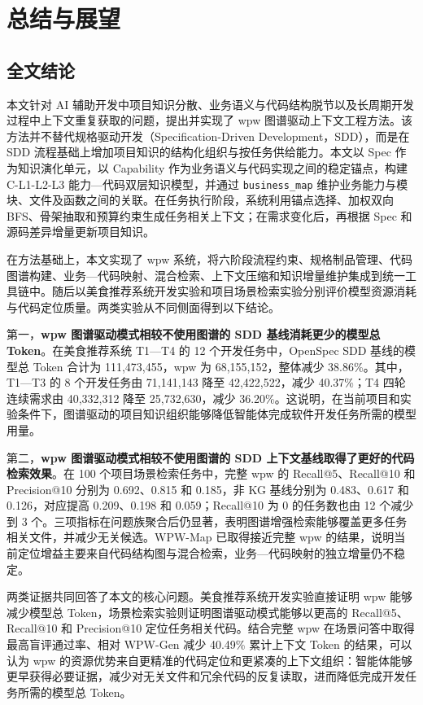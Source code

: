 \chapter{总结与展望}


\section{全文结论}
本文针对 AI 辅助开发中项目知识分散、业务语义与代码结构脱节以及长周期开发过程中上下文重复获取的问题，提出并实现了 wpw 图谱驱动上下文工程方法。该方法并不替代规格驱动开发（Specification-Driven Development，SDD），而是在 SDD 流程基础上增加项目知识的结构化组织与按任务供给能力。本文以 Spec 作为知识演化单元，以 Capability 作为业务语义与代码实现之间的稳定锚点，构建 C-L1-L2-L3 能力—代码双层知识模型，并通过 \texttt{business\_map} 维护业务能力与模块、文件及函数之间的关联。在任务执行阶段，系统利用锚点选择、加权双向 BFS、骨架抽取和预算约束生成任务相关上下文；在需求变化后，再根据 Spec 和源码差异增量更新项目知识。

在方法基础上，本文实现了 wpw 系统，将六阶段流程约束、规格制品管理、代码图谱构建、业务—代码映射、混合检索、上下文压缩和知识增量维护集成到统一工具链中。随后以美食推荐系统开发实验和项目场景检索实验分别评价模型资源消耗与代码定位质量。两类实验从不同侧面得到以下结论。

第一，\textbf{wpw 图谱驱动模式相较不使用图谱的 SDD 基线消耗更少的模型总 Token}。在美食推荐系统 T1—T4 的 12 个开发任务中，OpenSpec SDD 基线的模型总 Token 合计为 111,473,455，wpw 为 68,155,152，整体减少 38.86\%。其中，T1—T3 的 8 个开发任务由 71,141,143 降至 42,422,522，减少 40.37\%；T4 四轮连续需求由 40,332,312 降至 25,732,630，减少 36.20\%。这说明，在当前项目和实验条件下，图谱驱动的项目知识组织能够降低智能体完成软件开发任务所需的模型用量。

第二，\textbf{wpw 图谱驱动模式相较不使用图谱的 SDD 上下文基线取得了更好的代码检索效果}。在 100 个项目场景检索任务中，完整 wpw 的 Recall@5、Recall@10 和 Precision@10 分别为 0.692、0.815 和 0.185，非 KG 基线分别为 0.483、0.617 和 0.126，对应提高 0.209、0.198 和 0.059；Recall@10 为 0 的任务数也由 12 个减少到 3 个。三项指标在问题族聚合后仍显著，表明图谱增强检索能够覆盖更多任务相关文件，并减少无关候选。WPW-Map 已取得接近完整 wpw 的结果，说明当前定位增益主要来自代码结构图与混合检索，业务—代码映射的独立增量仍不稳定。

两类证据共同回答了本文的核心问题。美食推荐系统开发实验直接证明 wpw 能够减少模型总 Token，场景检索实验则证明图谱驱动模式能够以更高的 Recall@5、Recall@10 和 Precision@10 定位任务相关代码。结合完整 wpw 在场景问答中取得最高盲评通过率、相对 WPW-Gen 减少 40.49\% 累计上下文 Token 的结果，可以认为 wpw 的资源优势来自更精准的代码定位和更紧凑的上下文组织：智能体能够更早获得必要证据，减少对无关文件和冗余代码的反复读取，进而降低完成开发任务所需的模型总 Token。

